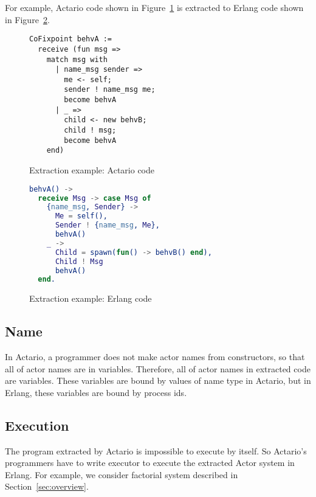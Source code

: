 For example, Actario code shown in Figure~\ref{coq:extractionex} is extracted to Erlang code shown in Figure~\ref{erl:extractionex}.

\begin{figure}[t]
\begin{lstlisting}
CoFixpoint behvA :=
  receive (fun msg =>
    match msg with
      | name_msg sender =>
        me <- self;
        sender ! name_msg me;
        become behvA
      | _ =>
        child <- new behvB;
        child ! msg;
        become behvA
    end)
\end{lstlisting}
\caption{Extraction example: Actario code}\label{coq:extractionex}
\end{figure}

\begin{figure}[t]
\begin{lstlisting}[language=erlang]
behvA() ->
  receive Msg -> case Msg of
    {name_msg, Sender} ->
      Me = self(),
      Sender ! {name_msg, Me},
      behvA()
    _ ->
      Child = spawn(fun() -> behvB() end),
      Child ! Msg
      behvA()
  end.
\end{lstlisting}
\caption{Extraction example: Erlang code}\label{erl:extractionex}
\end{figure}

\subsection{Name}
In Actario, a programmer does not make actor names from constructors, so that all of actor names are in variables.
Therefore, all of actor names in extracted code are variables.
These variables are bound by values of name type in Actario, but in Erlang, these variables are bound by process ids.

\subsection{Execution}
The program extracted by Actario is impossible to execute by itself.
So Actario's programmers have to write executor to execute the extracted Actor system in Erlang.
For example, we consider factorial system described in Section~\ref{sec:overview}.

